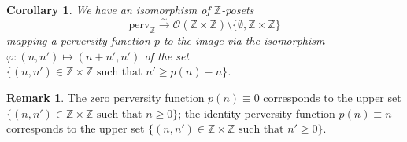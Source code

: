 \documentclass{article}
\newtheorem{cor}[thm]{Corollary}
\theoremstyle{definition}
\newtheorem{rem}[thm]{Remark}
\newcommand{\Z}{\mathbb{Z}}
\newcommand{\Oo}{\mathcal{O}}
\begin{document}
\begin{cor}\label{corperv}
We have an isomorphism of $\Z$-posets
\[
\mathrm{perv}_\Z\xrightarrow{\sim} \Oo(\Z\times \Z)\setminus\{\emptyset,\Z\times\Z\}
\]
mapping a perversity function $p$ to the image via the isomorphism $\varphi\colon (n,n')\mapsto (n+n',n')$ of the set $\{(n,n')\in \Z\times \Z\text{ such that } n'\geq p(n)-n\}$.
\end{cor}

\begin{rem}
The zero perversity function $p(n)\equiv 0$ corresponds to the upper set $\{(n,n')\in \Z\times \Z\text{ such that } n\geq 0\}$; the identity perversity function $p(n)\equiv n$ corresponds to the upper set $\{(n,n')\in \Z\times \Z\text{ such that } n'\geq 0\}$.
\end{rem}
\end{document}
